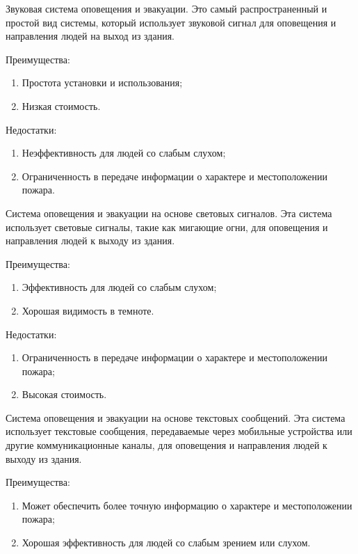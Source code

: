 \begin{multicols}{2}
Звуковая система оповещения и эвакуации. Это самый распространенный и
простой вид системы, который использует звуковой сигнал для оповещения и
направления людей на выход из здания.

Преимущества:

\begin{enumerate}
\def\labelenumi{\arabic{enumi}.}
\item
  Простота установки и использования;
\item
  Низкая стоимость.
\end{enumerate}

Недостатки:

\begin{enumerate}
\def\labelenumi{\arabic{enumi}.}
\item
  Неэффективность для людей со слабым слухом;
\item
  Ограниченность в передаче информации о характере и местоположении
  пожара.
\end{enumerate}

Система оповещения и эвакуации на основе световых сигналов. Эта система
использует световые сигналы, такие как мигающие огни, для оповещения и
направления людей к выходу из здания.

Преимущества:

\begin{enumerate}
\def\labelenumi{\arabic{enumi}.}
\item
  Эффективность для людей со слабым слухом;
\item
  Хорошая видимость в темноте.
\end{enumerate}

Недостатки:

\begin{enumerate}
\def\labelenumi{\arabic{enumi}.}
\item
  Ограниченность в передаче информации о характере и местоположении
  пожара;
\item
  Высокая стоимость.
\end{enumerate}

Система оповещения и эвакуации на основе текстовых сообщений. Эта
система использует текстовые сообщения, передаваемые через мобильные
устройства или другие коммуникационные каналы, для оповещения и
направления людей к выходу из здания.

Преимущества:

\begin{enumerate}
\def\labelenumi{\arabic{enumi}.}
\item
  Может обеспечить более точную информацию о характере и местоположении
  пожара;
\item
  Хорошая эффективность для людей со слабым зрением или слухом.
\end{enumerate}


\end{multicols}
